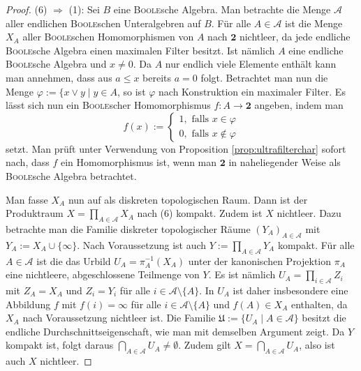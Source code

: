 \begin{proof}
  (6) $\Rightarrow$ (1):
  Sei $B$ eine \textsc{Boole}sche Algebra.
  Man betrachte die Menge $\mathcal{A}$ aller endlichen \textsc{Boole}schen Unteralgebren auf $B$.
  Für alle $A \in \mathcal{A}$ ist die Menge $X_A$ aller \textsc{Boole}schen Homomorphismen von $A$ nach $\mathbf{2}$ nichtleer, da jede endliche \textsc{Boole}sche Algebra einen maximalen Filter besitzt.
  Ist nämlich $A$ eine endliche \textsc{Boole}sche Algebra und $x \neq 0$.
  Da $A$ nur endlich viele Elemente enthält kann man annehmen, dass aus $a \leq x$ bereits $a = 0$ folgt.
  Betrachtet man nun die Menge $\varphi := \{x \lor y \mid y \in A$, so ist $\varphi$ nach Konstruktion ein maximaler Filter.
  Es lässt sich nun ein \textsc{Boole}scher Homomorphismus $f \colon A \to \mathbf{2}$ angeben, indem man 
  \begin{displaymath}
    f(x) := 
    \begin{cases}
      1, \text{ falls } x \in \varphi \\
      0, \text{ falls } x \not\in \varphi
    \end{cases}
  \end{displaymath}
  setzt.
  Man prüft unter Verwendung von Proposition \ref{prop:ultrafilterchar} sofort nach, dass $f$ ein Homomorphismus ist, wenn man $\mathbf{2}$ in naheliegender Weise als \textsc{Boole}sche Algebra betrachtet.

  Man fasse $X_A$ nun auf als diskreten topologischen Raum.
  Dann ist der Produktraum $X = \prod_{A \in \mathcal{A}} X_A$ nach (6) kompakt.
  Zudem ist $X$ nichtleer.
  Dazu betrachte man die Familie diskreter topologischer Räume $(Y_A)_{A \in \mathcal{A}}$ mit $Y_A := X_A \cup \{\infty\}$.
  Nach Voraussetzung ist auch $Y := \prod_{A \in \mathcal{A}} Y_A$ kompakt.
  Für alle $A \in \mathcal{A}$ ist die das Urbild $U_A = \pi_A^{-1}(X_A)$ unter der kanonischen Projektion $\pi_A$ eine nichtleere, abgeschlossene Teilmenge von $Y$.
  Es ist nämlich $U_A = \prod_{i \in \mathcal{A}} Z_i$ mit $Z_A = X_A$ und $Z_i = Y_i$ für alle $i \in \mathcal{A} \setminus \{A\}$.
  In $U_A$ ist daher insbesondere eine Abbildung $f$ mit $f(i) = \infty$ für alle $i \in \mathcal{A} \setminus \{A\}$ und $f(A) \in X_A$ enthalten, da $X_A$ nach Voraussetzung nichtleer ist.
  Die Familie $\mathfrak{U} := \{U_A \mid A \in \mathcal{A}\}$ besitzt die endliche Durchschnittseigenschaft, wie man mit demselben Argument zeigt.
  Da $Y$ kompakt ist, folgt daraus $\bigcap_{A \in \mathcal{A}} U_A \neq \emptyset$.
  Zudem gilt $X = \bigcap_{A \in \mathcal{A}} U_A$, also ist auch $X$ nichtleer.


\end{proof}
